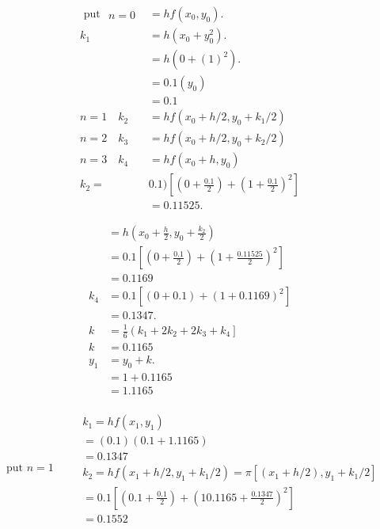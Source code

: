 \documentclass[12pt]{exam}
\begin{document}
\begin{questions}
\begin{parts}
\begin{solution}
        $$
        \begin{aligned}
        \text { put } \begin{aligned}
        n=0
        \end{aligned} & =h f\left(x_{0}, y_{0}\right) . \\
        k_{1} & =h\left(x_{0}+y_{0}^{2}\right) . \\
        & =h\left(0+(1)^{2}\right) . \\
        & =0.1\left(y_{0}\right) \\
        & =0.1 \\
        n=1 \quad k_{2} & =h f\left(x_{0}+h / 2, y_{0}+k_{1} / 2\right) \\
        n=2 \quad k_{3} & =h f\left(x_{0}+h / 2, y_{0}+k_{2} / 2\right) \\
        n=3 \quad k_{4} & =h f\left(x_{0}+h, y_{0}\right) \\
        k_{2}= & 0.1)\left[\left(0+\frac{0.1}{2}\right)+\left(1+\frac{0.1}{2}\right)^{2}\right] \\
        & =0.11525 .
        \end{aligned}
        $$
        
        $$
        \begin{aligned}
        & =h\left(x_{0}+\frac{h}{2}, y_{0}+\frac{k_{2}}{2}\right) \\
        & =0.1\left[\left(0+\frac{0.1}{2}\right)+\left(1+\frac{0.11525}{2}\right)^{2}\right] \\
        & =0.1169 \\
        k_{4} & =0.1\left[(0+0.1)+(1+0.1169)^{2}\right] \\
        & =0.1347 . \\
        k & =\frac{1}{6}\left(k_{1}+2 k_{2}+2 k_{3}+k_{4}\right] \\
        k & =0.1165 \\
        y_{1} & =y_{0}+k . \\
        & =1+0.1165 \\
        & =1.1165
        \end{aligned}
        $$
        \\[15pt]
        $$
        \begin{aligned}
        \text { put } n=1
        \end{aligned} \quad \begin{aligned}
        & k_{1}=h f\left(x_{1}, y_{1}\right) \\
        &=(0.1)(0.1+1.1165) \\
        &=0.1347 \\
        & k_{2}=h f\left(x_{1}+h / 2, y_{1}+k_{1} / 2\right)=\pi\left[\left(x_{1}+h / 2\right), y_{1}+k_{1} / 2\right] \\
        &=0.1\left[\left(0.1+\frac{0.1}{2}\right)+\left(10.1165+\frac{0.1347}{2}\right)^{2}\right] \\
        &=0.1552
        \end{aligned}
        $$
        

\end{solution}
\end{parts}
\end{questions}
\end{document}
